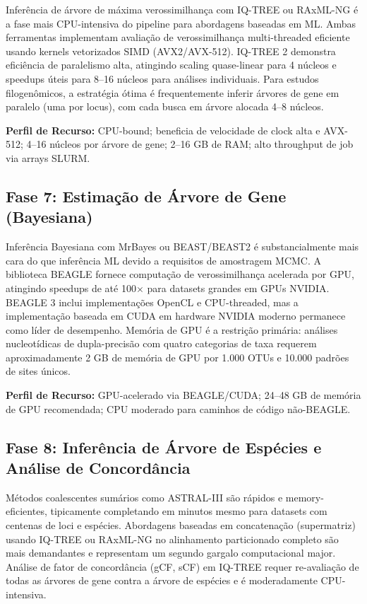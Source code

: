 Inferência de árvore de máxima verossimilhança com IQ-TREE \parencite{minh2020} ou RAxML-NG \parencite{kozlov2019} é a fase mais CPU-intensiva do pipeline para abordagens baseadas em ML. Ambas ferramentas implementam avaliação de verossimilhança multi-threaded eficiente usando kernels vetorizados SIMD (AVX2/AVX-512). IQ-TREE 2 demonstra eficiência de paralelismo alta, atingindo scaling quase-linear para 4 núcleos e speedups úteis para 8--16 núcleos para análises individuais. Para estudos filogenômicos, a estratégia ótima é frequentemente inferir árvores de gene em paralelo (uma por locus), com cada busca em árvore alocada 4--8 núcleos.

\textbf{Perfil de Recurso:} CPU-bound; beneficia de velocidade de clock alta e AVX-512; 4--16 núcleos por árvore de gene; 2--16 GB de RAM; alto throughput de job via arrays SLURM.

\subsection{Fase 7: Estimação de Árvore de Gene (Bayesiana)}

Inferência Bayesiana com MrBayes \parencite{ronquist2012} ou BEAST/BEAST2 \parencite{bouckaert2019} é substancialmente mais cara do que inferência ML devido a requisitos de amostragem MCMC. A biblioteca BEAGLE \parencite{ayres2019} fornece computação de verossimilhança acelerada por GPU, atingindo speedups de até 100$\times$ para datasets grandes em GPUs NVIDIA. BEAGLE 3 inclui implementações OpenCL e CPU-threaded, mas a implementação baseada em CUDA em hardware NVIDIA moderno permanece como líder de desempenho. Memória de GPU é a restrição primária: análises nucleotídicas de dupla-precisão com quatro categorias de taxa requerem aproximadamente 2 GB de memória de GPU por 1.000 OTUs e 10.000 padrões de sites únicos.

\textbf{Perfil de Recurso:} GPU-acelerado via BEAGLE/CUDA; 24--48 GB de memória de GPU recomendada; CPU moderado para caminhos de código não-BEAGLE.

\subsection{Fase 8: Inferência de Árvore de Espécies e Análise de Concordância}

Métodos coalescentes sumários como ASTRAL-III \parencite{zhang2018} são rápidos e memory-eficientes, tipicamente completando em minutos mesmo para datasets com centenas de loci e espécies. Abordagens baseadas em concatenação (supermatriz) usando IQ-TREE ou RAxML-NG no alinhamento particionado completo são mais demandantes e representam um segundo gargalo computacional major. Análise de fator de concordância (gCF, sCF) em IQ-TREE requer re-avaliação de todas as árvores de gene contra a árvore de espécies e é moderadamente CPU-intensiva.

